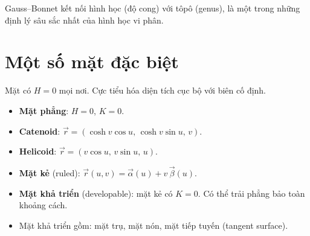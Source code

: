 \documentclass[12pt,a4paper]{article}
\begin{document}
\begin{luuy}
  Gauss--Bonnet kết nối hình học (độ cong) với tôpô (genus), là một trong những định lý sâu sắc nhất của hình học vi phân.
\end{luuy}

\section{Một số mặt đặc biệt}

\begin{dinhnghia}[title={Mặt cực tiểu (minimal surface)}]
  Mặt có $H = 0$ mọi nơi. Cực tiểu hóa diện tích cục bộ với biên cố định.
\end{dinhnghia}

\begin{vidu}
  \begin{itemize}
    \item \textbf{Mặt phẳng}: $H = 0$, $K = 0$.
    \item \textbf{Catenoid}: $\vec{r} = (\cosh v\cos u,\, \cosh v\sin u,\, v)$.
    \item \textbf{Helicoid}: $\vec{r} = (v\cos u,\, v\sin u,\, u)$.
  \end{itemize}
\end{vidu}

\begin{dinhnghia}[title={Mặt kẻ và mặt khả triển}]
  \begin{itemize}
    \item \textbf{Mặt kẻ} (ruled): $\vec{r}(u, v) = \vec{\alpha}(u) + v\,\vec{\beta}(u)$.
    \item \textbf{Mặt khả triển} (developable): mặt kẻ có $K = 0$. Có thể trải phẳng bảo toàn khoảng cách.
    \item Mặt khả triển gồm: mặt trụ, mặt nón, mặt tiếp tuyến (tangent surface).
  \end{itemize}
\end{dinhnghia}
\end{document}
